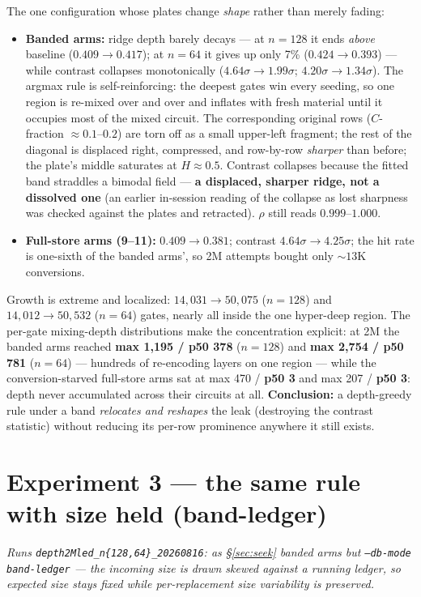 \documentclass[11pt]{article}
\newcommand{\code}[1]{\texttt{#1}}
\begin{document}
The one configuration whose plates change \emph{shape} rather than merely fading:
\begin{itemize}
\item \textbf{Banded arms:} ridge depth barely decays --- at $n{=}128$ it ends \emph{above} baseline
($0.409\to0.417$); at $n{=}64$ it gives up only 7\% ($0.424\to0.393$) --- while contrast collapses
monotonically ($4.64\sigma\to1.99\sigma$; $4.20\sigma\to1.34\sigma$). The argmax rule is self-reinforcing: the deepest gates win every seeding,
so one region is re-mixed over and over and inflates with fresh material until it occupies most of the
mixed circuit. The corresponding original rows ($C$-fraction ${\approx}0.1$--$0.2$) are torn off as a
small upper-left fragment; the rest of the diagonal is displaced right, compressed, and row-by-row
\emph{sharper} than before; the plate's middle saturates at $H{\approx}0.5$. Contrast collapses because
the fitted band straddles a bimodal field --- \textbf{a displaced, sharper ridge, not a dissolved one}
(an earlier in-session reading of the collapse as lost sharpness was checked against the plates and
retracted). $\rho$ still reads $0.999$--$1.000$.
\item \textbf{Full-store arms (9--11):} $0.409\to0.381$; contrast $4.64\sigma\to4.25\sigma$; the hit
rate is one-sixth of the banded arms', so 2M attempts bought only ${\sim}13$K conversions.
\end{itemize}
Growth is extreme and localized: $14{,}031\to50{,}075$ ($n{=}128$) and $14{,}012\to50{,}532$ ($n{=}64$) gates, nearly all inside the one
hyper-deep region. The per-gate mixing-depth distributions make the concentration explicit: at 2M the
banded arms reached \textbf{max 1{,}195 / p50 378} ($n{=}128$) and \textbf{max 2{,}754 / p50 781}
($n{=}64$) --- hundreds of re-encoding layers on one region --- while the conversion-starved
full-store arms sat at max 470 / \textbf{p50 3} and max 207 / \textbf{p50 3}: depth never accumulated
across their circuits at all. \textbf{Conclusion:} a depth-greedy rule under a band \emph{relocates
and reshapes} the leak (destroying the contrast statistic) without reducing its per-row prominence
anywhere it still exists.

\section{Experiment 3 --- the same rule with size held (band-ledger)}
\emph{Runs \code{depth2Mled\_n\{128,64\}\_20260816}: as \S\ref{sec:seek} banded arms but
\code{--db-mode band-ledger} --- the incoming size is drawn skewed against a running ledger, so
expected size stays fixed while per-replacement size variability is preserved.}
\end{document}

